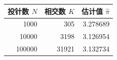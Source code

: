 \begin{tabular}{rrr}
\toprule
投针数 $N$ & 相交数 $K$ & 估计值 $\widehat{\pi}$ \\
\midrule
1000 & 305 & 3.278689 \\
10000 & 3198 & 3.126954 \\
100000 & 31921 & 3.132734 \\
\bottomrule
\end{tabular}
